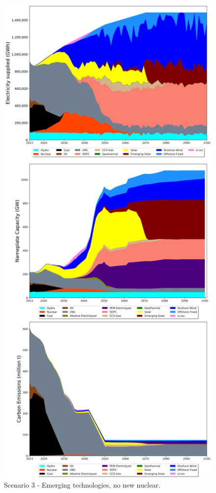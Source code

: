 \begin{figure}[H] 
\centering
\vspace*{-3cm}
\includegraphics[scale=0.41]{figures/newtechs_nonuc}
\caption{Scenario 3 - Emerging technologies, no new nuclear.}
\label{scen3}
\end{figure}

